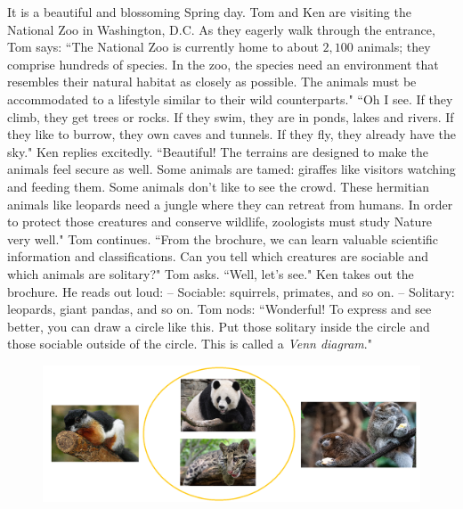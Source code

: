 \begin{multicols}{2}
	It is a beautiful and blossoming Spring day. Tom and Ken are visiting the National Zoo in Washington, D.C. 
	\vskip 0.1cm
	As they eagerly walk through the entrance, Tom says: ``The National Zoo is currently home to about $2{,}100$ animals; they comprise hundreds of species. In the zoo, the species need an environment that resembles their natural habitat as closely as possible. The animals must be accommodated to a lifestyle similar to their wild counterparts."
	\vskip 0.1cm
	``Oh I see. If they climb, they get trees or rocks. If they swim, they are in ponds, lakes and rivers. If they like to burrow, they own caves and tunnels. If they fly, they already have the sky." Ken replies excitedly.
	\vskip 0.1cm
	``Beautiful! The terrains are designed to make the animals feel secure as well. Some animals are tamed: giraffes like visitors watching and feeding them. Some animals don't like to see the crowd. These hermitian animals like leopards need a jungle where they can retreat from humans. In order to protect those creatures and conserve wildlife, zoologists must study Nature very well." Tom continues.
	\vskip 0.1cm
	``From the brochure, we can learn valuable scientific information and classifications. Can you tell which creatures are sociable and which animals are solitary?" Tom asks.
	\vskip 0.1cm
	``Well, let's see." Ken takes out the brochure. He reads out loud:
	\vskip 0.1cm
	--	Sociable: squirrels, primates, and so on.
	\vskip 0.1cm
	--	Solitary: leopards, giant pandas, and so on. 
	\vskip 0.1cm
	Tom nods: ``Wonderful! To express and see better, you can draw a circle like this. Put those solitary inside the circle and those sociable outside of the circle. This is called a \textit{Venn diagram}."
	\begin{figure}[H]
			\vspace*{-10pt}
			\centering
			\captionsetup{labelformat= empty, justification=centering}
			\includegraphics[width= 1\linewidth]{p1}
			\vspace*{-15pt}
		\end{figure}	

\end{multicols}

